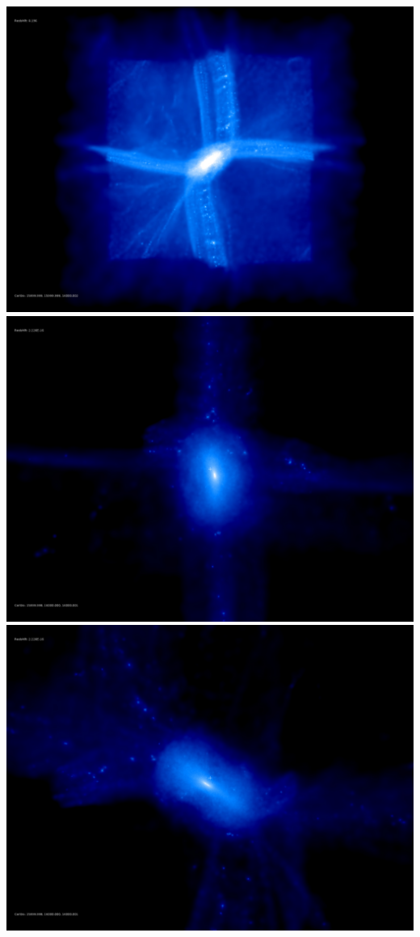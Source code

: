 \includegraphics[scale=0.1]{r256/h70/mm_h/150.jpg} 
\includegraphics[scale=0.1]{r256/h70/mm_h/rotate_00074.jpg} \\
\includegraphics[scale=0.15]{r256/h70/mm_h/rotate_00131.jpg} 

